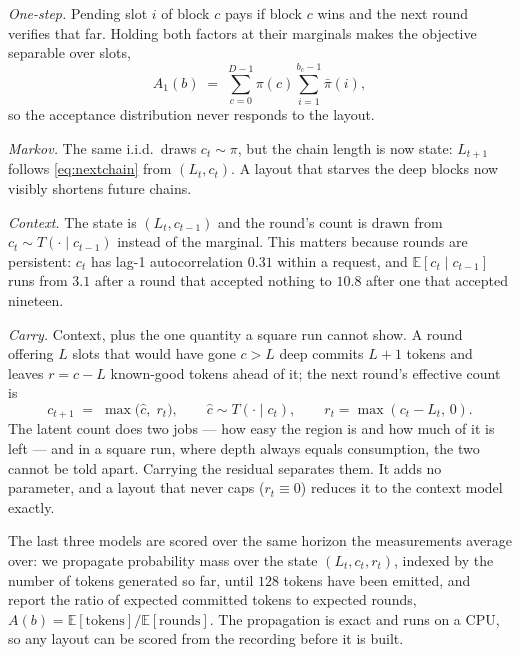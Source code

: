 \documentclass{article} %
\makeatletter
\newenvironment{ai}
  {\color{lightgray}%
   \@ifpackageloaded{caption}{\captionsetup{font={color=lightgray}}}{}%
   \let\ai@savedfloatreset\@floatboxreset
   \g@addto@macro\@floatboxreset{\color{lightgray}}}
  {\global\let\@floatboxreset\ai@savedfloatreset}
\makeatother
\begin{document}
\begin{ai}
\emph{One-step.} Pending slot $i$ of block $c$ pays if block $c$ wins and the
next round verifies that far. Holding both factors at their marginals makes the
objective separable over slots,
\begin{equation}
  A_{\mathrm{1}}(b) \;=\; \sum_{c=0}^{D-1} \pi(c) \sum_{i=1}^{b_c - 1} \bar\pi(i),
  \label{eq:onestep}
\end{equation}
so the acceptance distribution never responds to the layout.

\emph{Markov.} The same i.i.d.\ draws $c_t \sim \pi$, but the chain length is
now state: $L_{t+1}$ follows \eqref{eq:nextchain} from $(L_t, c_t)$. A layout
that starves the deep blocks now visibly shortens future chains.

\emph{Context.} The state is $(L_t, c_{t-1})$ and the round's count is drawn
from $c_t \sim T(\cdot \mid c_{t-1})$ instead of the marginal. This matters
because rounds are persistent: $c_t$ has lag-1 autocorrelation $0.31$ within a
request, and $\mathbb{E}[c_t \mid c_{t-1}]$ runs from $3.1$ after a round that
accepted nothing to $10.8$ after one that accepted nineteen.

\emph{Carry.} Context, plus the one quantity a square run cannot show. A round
offering $L$ slots that would have gone $c > L$ deep commits $L + 1$ tokens and
leaves $r = c - L$ known-good tokens ahead of it; the next round's effective
count is
\begin{equation}
  c_{t+1} \;=\; \max\big(\hat c,\; r_t\big),
  \qquad \hat c \sim T(\cdot \mid c_t),
  \qquad r_t = \max(c_t - L_t,\, 0).
  \label{eq:carry}
\end{equation}
The latent count does two jobs --- how easy the region is and how much of it is
left --- and in a square run, where depth always equals consumption, the two
cannot be told apart. Carrying the residual separates them. It adds no
parameter, and a layout that never caps ($r_t \equiv 0$) reduces it to the
context model exactly.

The last three models are scored over the same horizon the measurements average
over: we propagate probability mass over the state $(L_t, c_t, r_t)$, indexed by
the number of tokens generated so far, until $128$ tokens have been emitted, and
report the ratio of expected committed tokens to expected rounds,
$A(b) = \mathbb{E}[\text{tokens}] / \mathbb{E}[\text{rounds}]$. The
propagation is exact and runs on a CPU, so any layout can be scored from the
recording before it is built.


\end{ai}
\end{document}
